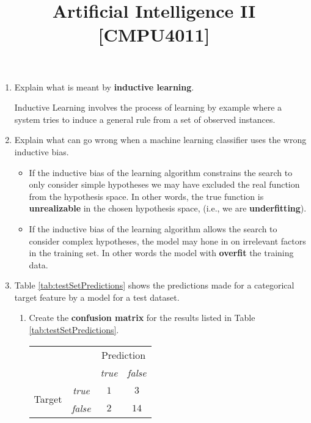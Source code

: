 \documentclass[--SOLUTION-OPTION--]{ditpaper}
\title{Artificial Intelligence II [CMPU4011]}
\begin{document}

\question
\begin{enumerate}
	\item Explain what is meant by \textbf{inductive learning}.
	\begin{answer}
		Inductive Learning involves the process of learning by example where a system tries to induce a general rule from a set of observed instances.
	\end{answer}
	\item Explain what can go wrong when a machine learning classifier uses the wrong inductive bias.
\begin{answer}
			\begin{itemize}
				\item If the inductive bias of the learning algorithm constrains the search to only consider simple hypotheses we may have excluded the real function from the hypothesis space. In other words, the true function is \textbf{unrealizable} in the chosen hypothesis space, (i.e., we are \textbf{underfitting}). 
				\item If the inductive bias of the learning algorithm allows the search to consider complex hypotheses, the model may hone in on irrelevant factors in the training set. In other words the model with \textbf{overfit} the training data.
			\end{itemize}
\end{answer}

	\item Table \ref{tab:testSetPredictions} shows the predictions made for a categorical target feature by a model for a test dataset. 
\begin{enumerate} 
\item Create the \textbf{confusion matrix} for the results listed in Table \ref{tab:testSetPredictions}.
\begin{answer}
\begin{tabular}{c c c  c }
   ~ & ~ &  \multicolumn{2}{c}{Prediction} \\
  ~ & ~ &  \textit{true} &  \textit{false} \\
  \hline
  \multirow{2}{*}{\parbox{1.1cm}{\raggedleft Target}}  & \textit{true} & $1$	&	$3$ \\
  & \textit{false} & $2$	&	$14$ 
\end{tabular}
\end{answer}


\end{enumerate}
\end{enumerate}
\end{document}
